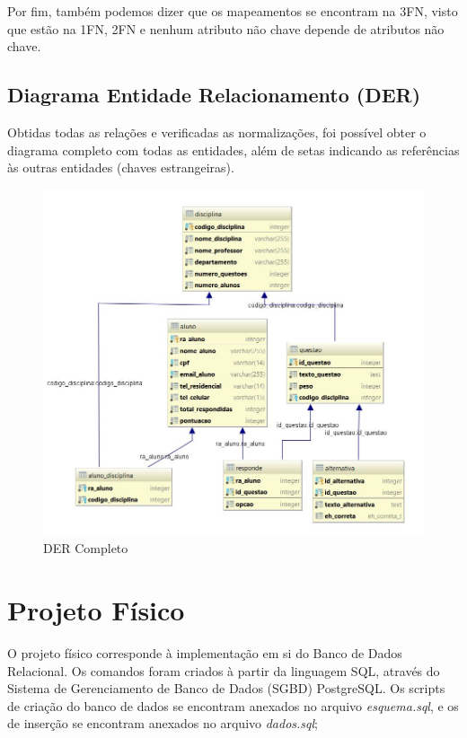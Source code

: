 \documentclass[12pt,a4paper]{article}
\begin{document}
Por fim, também podemos dizer que os mapeamentos se encontram na 3FN, visto que estão na 1FN, 2FN e nenhum atributo não chave depende de atributos não chave.

\subsection{Diagrama Entidade Relacionamento (DER)}

Obtidas todas as relações e verificadas as normalizações, foi possível obter o diagrama completo com todas as entidades, além de setas indicando as referências às outras entidades (chaves estrangeiras).

\begin{center}
\begin{figure}[h]
    \centering
    \includegraphics[width=\linewidth]{mapeamento.jpg}
    \caption{DER Completo}
    \label{fig:DERcompleto}
\end{figure}
\end{center}

\newpage
\section{Projeto Físico}

O projeto físico corresponde à implementação em si do Banco de Dados Relacional. Os comandos foram criados à partir da linguagem SQL, através do Sistema de Gerenciamento de Banco de Dados (SGBD) PostgreSQL. Os scripts de criação do banco de dados se encontram anexados no arquivo \textit{esquema.sql}, e os de inserção se encontram anexados no arquivo \textit{dados.sql};
\vspace{0.5cm}
\end{document}
